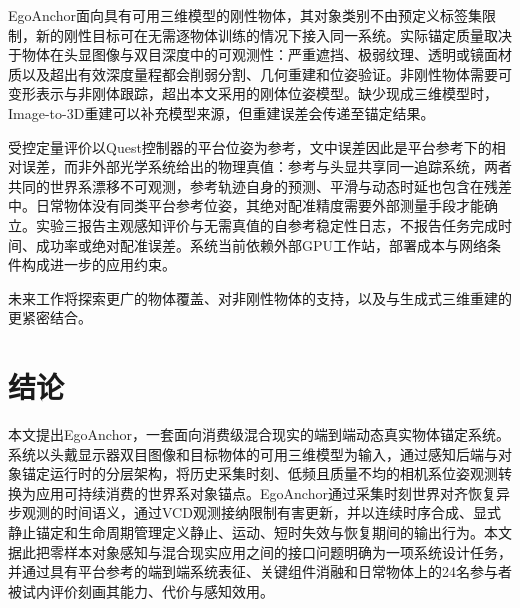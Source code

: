 \documentclass[review]{vgtc}
\begin{document}
EgoAnchor面向具有可用三维模型的刚性物体，其对象类别不由预定义标签集限制，新的刚性目标可在无需逐物体训练的情况下接入同一系统。实际锚定质量取决于物体在头显图像与双目深度中的可观测性：严重遮挡、极弱纹理、透明或镜面材质以及超出有效深度量程都会削弱分割、几何重建和位姿验证。非刚性物体需要可变形表示与非刚体跟踪，超出本文采用的刚体位姿模型。缺少现成三维模型时，Image-to-3D重建可以补充模型来源，但重建误差会传递至锚定结果。

受控定量评价以Quest控制器的平台位姿为参考，文中误差因此是平台参考下的相对误差，而非外部光学系统给出的物理真值：参考与头显共享同一追踪系统，两者共同的世界系漂移不可观测，参考轨迹自身的预测、平滑与动态时延也包含在残差中。日常物体没有同类平台参考位姿，其绝对配准精度需要外部测量手段才能确立。实验三报告主观感知评价与无需真值的自参考稳定性日志，不报告任务完成时间、成功率或绝对配准误差。系统当前依赖外部GPU工作站，部署成本与网络条件构成进一步的应用约束。

未来工作将探索更广的物体覆盖、对非刚性物体的支持，以及与生成式三维重建的更紧密结合。

\section{结论}\label{sec:conclusion}

本文提出EgoAnchor，一套面向消费级混合现实的端到端动态真实物体锚定系统。系统以头戴显示器双目图像和目标物体的可用三维模型为输入，通过感知后端与对象锚定运行时的分层架构，将历史采集时刻、低频且质量不均的相机系位姿观测转换为应用可持续消费的世界系对象锚点。EgoAnchor通过采集时刻世界对齐恢复异步观测的时间语义，通过VCD观测接纳限制有害更新，并以连续时序合成、显式静止锚定和生命周期管理定义静止、运动、短时失效与恢复期间的输出行为。本文据此把零样本对象感知与混合现实应用之间的接口问题明确为一项系统设计任务，并通过具有平台参考的端到端系统表征、关键组件消融和日常物体上的24名参与者被试内评价刻画其能力、代价与感知效用。

\clearpage
\raggedbottom



\end{document}
